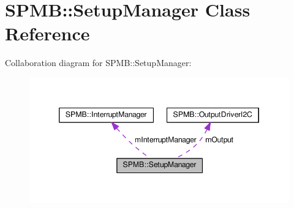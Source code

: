 \hypertarget{classSPMB_1_1SetupManager}{}\section{S\+P\+MB\+:\+:Setup\+Manager Class Reference}
\label{classSPMB_1_1SetupManager}


Collaboration diagram for S\+P\+MB\+:\+:Setup\+Manager\+:
\nopagebreak
\begin{figure}[H]
\begin{center}
\leavevmode
\includegraphics[width=346pt]{classSPMB_1_1SetupManager__coll__graph}
\end{center}
\end{figure}
